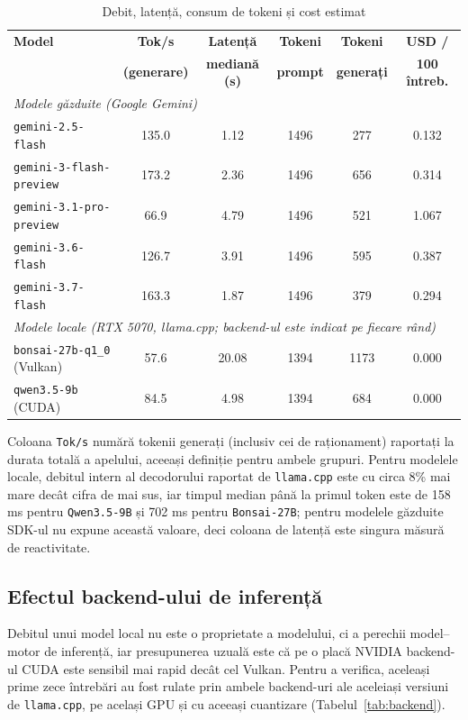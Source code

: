 \documentclass[12pt, a4paper]{report}
\newcommand{\code}[1]{\texttt{#1}}
\begin{document}
\begin{table}[H]
\centering
\caption{Debit, latență, consum de tokeni și cost estimat}
\label{tab:model_throughput}
\begin{tabular}{l c c c c c}
\toprule
\textbf{Model} & \textbf{Tok/s} & \textbf{Latență} & \textbf{Tokeni} & \textbf{Tokeni} & \textbf{USD /} \\
 & \textbf{(generare)} & \textbf{mediană (s)} & \textbf{prompt} & \textbf{generați} & \textbf{100 întreb.} \\
\midrule
\multicolumn{6}{l}{\emph{Modele găzduite (Google Gemini)}} \\
\code{gemini-2.5-flash} & 135.0 & 1.12 & 1496 & 277 & 0.132 \\
\code{gemini-3-flash-preview} & 173.2 & 2.36 & 1496 & 656 & 0.314 \\
\code{gemini-3.1-pro-preview} & 66.9 & 4.79 & 1496 & 521 & 1.067 \\
\code{gemini-3.6-flash} & 126.7 & 3.91 & 1496 & 595 & 0.387 \\
\code{gemini-3.7-flash} & 163.3 & 1.87 & 1496 & 379 & 0.294 \\
\midrule
\multicolumn{6}{l}{\emph{Modele locale (RTX 5070, llama.cpp; backend-ul este indicat pe fiecare rând)}} \\
\code{bonsai-27b-q1\_0} (Vulkan) & 57.6 & 20.08 & 1394 & 1173 & 0.000 \\
\code{qwen3.5-9b} (CUDA) & 84.5 & 4.98 & 1394 & 684 & 0.000 \\
\bottomrule
\end{tabular}
\end{table}

Coloana \code{Tok/s} numără tokenii generați (inclusiv cei de raționament)
raportați la durata totală a apelului, aceeași definiție pentru ambele grupuri.
Pentru modelele locale, debitul intern al decodorului raportat de
\code{llama.cpp} este cu circa 8\% mai mare decât cifra de mai sus, iar timpul
median până la primul token este de 158 ms pentru \code{Qwen3.5-9B} și 702 ms
pentru \code{Bonsai-27B}; pentru modelele găzduite SDK-ul nu expune această
valoare, deci coloana de latență este singura măsură de reactivitate.

\subsection{Efectul backend-ului de inferență}

Debitul unui model local nu este o proprietate a modelului, ci a perechii
model--motor de inferență, iar presupunerea uzuală este că pe o placă NVIDIA
backend-ul CUDA este sensibil mai rapid decât cel Vulkan. Pentru a verifica,
aceleași prime zece întrebări au fost rulate prin ambele backend-uri ale
aceleiași versiuni de \code{llama.cpp}, pe același GPU și cu aceeași
cuantizare (Tabelul~\ref{tab:backend}).
\end{document}
